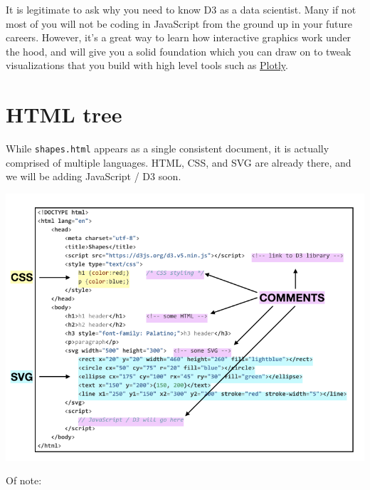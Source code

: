 \documentclass[openany]{book}
\begin{document}
It is legitimate to ask why you need to know D3 as a data scientist. Many if not most of you will not be coding in JavaScript from the ground up in your future careers. However, it's a great way to learn how interactive graphics work under the hood, and will give you a solid foundation which you can draw on to tweak visualizations that you build with high level tools such as \href{https://plot.ly/}{Plotly}.

\hypertarget{html-tree}{%
\section{HTML tree }\label{html-tree}}

While \texttt{shapes.html} appears as a single consistent document, it is actually comprised of multiple languages. HTML, CSS, and SVG are already there, and we will be adding JavaScript / D3 soon.

\begin{center}\includegraphics[width=1\linewidth]{images/shapes} \end{center}

Of note:
\end{document}
